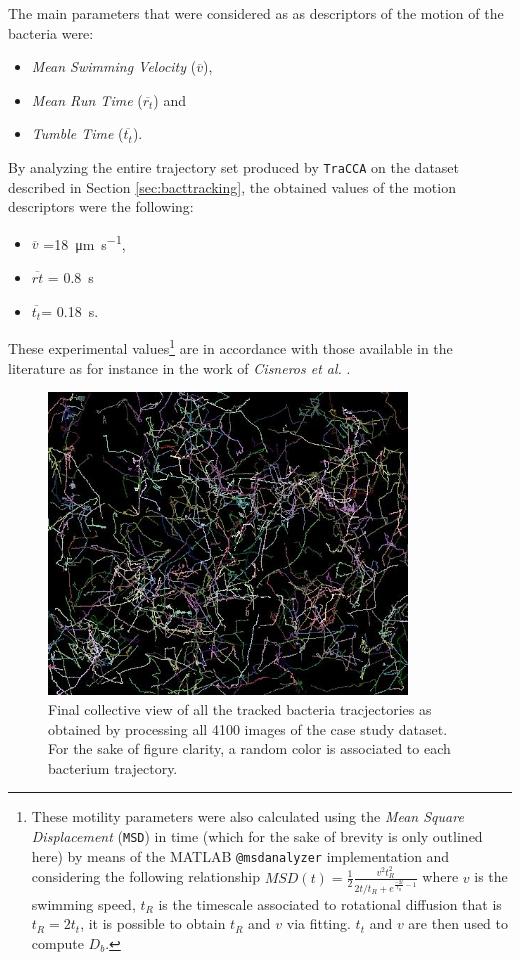 The main parameters that were considered as as descriptors of the motion of the bacteria were: 
\begin{itemize}
\item \textit{Mean Swimming Velocity} ($\overline{v}$),
\item \textit{Mean Run Time} ($\overline{r_t}$) and 
\item \textit{Tumble Time} ($\overline{t_t}$).
\end{itemize}
By analyzing the entire trajectory set produced by \texttt{TraCCA} on the dataset described in Section \ref{sec:bacttracking}, the obtained values of the motion descriptors  were the following: 
\begin{itemize}
\item $\overline{v}$ =\SI{18}{\micro\meter \per \second},
\item $\overline{rt}$ = \SI{0.8}{\second}
\item $\overline{t_t}$= \SI{0.18}{\second}.
\end{itemize}
These experimental values\footnote{These motility parameters were also calculated using the \textit{Mean Square Displacement} (\texttt{MSD}) in time (which for the sake of brevity is only outlined here) by means of the MATLAB \texttt{@msdanalyzer} implementation \cite{Tarantino231} and considering the following relationship $MSD(t)=\frac{1}{2}\frac{v^2 t_R^2}{2t/t_R +e^{\frac{-2t}{t_R}-1}}$ \cite{Howse:2007} where $v$ is the swimming speed, $t_R$ is the timescale associated to rotational diffusion that is $t_R=2t_t$, it is possible to obtain $t_R $ and $v$ via fitting. $t_t$ and $v$ are then used to compute $D_b$.} are in accordance with those available in the literature as for instance in the work of \textit{Cisneros et al.} \cite{Cisneros:2011}.
\begin{figure}
	\begin{center}
		\includegraphics[width=0.85\textwidth]{./images/bacteria/result.png}
		\caption{Final collective view of all the tracked bacteria tracjectories as obtained by processing all 4100 images of the case study dataset. For the sake of figure clarity, a random color is associated to each bacterium trajectory.}\label{result}
	\end{center}
\end{figure}

